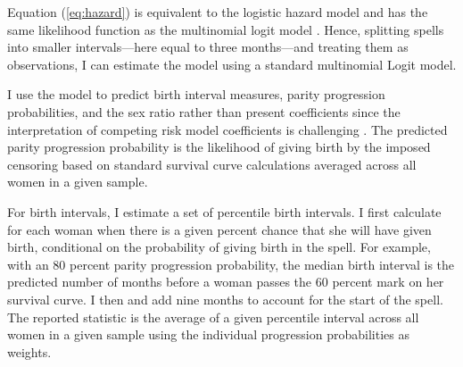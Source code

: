 \documentclass[12pt,letterpaper]{article}
\begin{document}


Equation (\ref{eq:hazard}) is equivalent to the logistic hazard model and has the same 
likelihood function as the multinomial logit model \citep{allison82,jenkins95}.
Hence, splitting spells into smaller intervals---here equal to three months---and 
treating them as observations, I can estimate the model using a standard multinomial 
Logit model. 

I use the model to predict birth interval measures, parity progression probabilities, 
and the sex ratio rather than present coefficients since the interpretation 
of competing risk model coefficients is challenging \citep{thomas96}.
The predicted parity progression probability is the likelihood of giving birth by the
imposed censoring based on standard survival curve calculations averaged across all
women in a given sample.

For birth intervals, I estimate a set of percentile birth intervals. 
I first calculate for each woman when there is a given percent chance that she will have 
given birth, conditional on the probability of giving birth in the spell. 
For example, with an 80 percent parity progression probability, the median birth interval 
is the predicted number of months before a woman passes the 60 percent mark on her survival 
curve. 
I then and add nine months to account for the start of the spell. 
The reported statistic is the average of a given percentile interval across all women in 
a given sample using the individual progression probabilities as weights.

\end{document}

